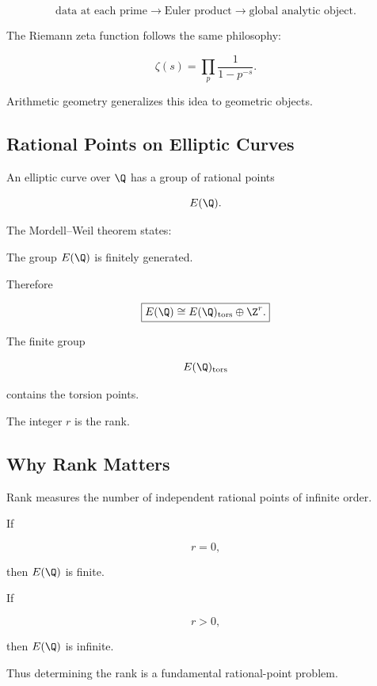 \[
\boxed{
\text{data at each prime}
\longrightarrow
\text{Euler product}
\longrightarrow
\text{global analytic object}.
}
\]

The Riemann zeta function follows the same philosophy:

\[ \zeta(s)=\prod_p\frac1{1-p^{-s}}. \]

Arithmetic geometry generalizes this idea to geometric objects.

\subsection{Rational Points on Elliptic Curves}
\label{subsec:rational-points-elliptic-arithmetic}

An elliptic curve over \(\Q\) has a group of rational points

\[ E(\Q). \]

The Mordell--Weil theorem states:

\begin{theorem}
The group \(E(\Q)\) is finitely generated.
\end{theorem}

Therefore

\[ \boxed{E(\Q)\cong E(\Q)_{\mathrm{tors}}\oplus\Z^r.} \]

The finite group

\[ E(\Q)_{\mathrm{tors}} \]

contains the torsion points.

The integer \(r\) is the rank.

\subsection{Why Rank Matters}
\label{subsec:why-rank-matters-arithmetic}

Rank measures the number of independent rational points of infinite order.

If

\[ r=0, \]

then \(E(\Q)\) is finite.

If

\[ r>0, \]

then \(E(\Q)\) is infinite.

Thus determining the rank is a fundamental rational-point problem.

